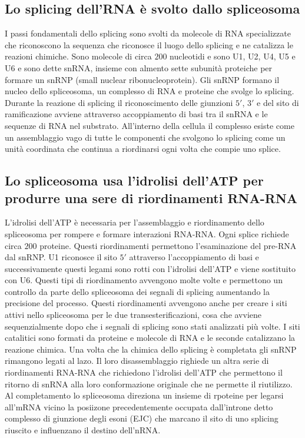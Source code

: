 \subsection{Lo splicing dell'RNA \`e svolto dallo spliceosoma}
I passi fondamentali dello splicing sono svolti da molecole di RNA specializzate che riconoscono la sequenza che riconosce il luogo dello splicing e ne catalizza le reazioni chimiche. 
Sono molecole di circa $200$ nucleotidi e sono U1, U2, U4, U5 e U6 e sono dette snRNA, insieme con almento sette subunit\`a proteiche per formare un snRNP (small nuclear 
ribonucleoprotein). Gli snRNP formano il nucleo dello spliceosoma, un complesso di RNA e proteine che svolge lo splicing. Durante la reazione di splicing il riconoscimento delle
giunzioni $5'$, $3'$ e del sito di ramificazione avviene attraverso accoppiamento di basi tra il snRNA e le sequenze di RNA nel substrato. All'interno della cellula il complesso esiste
come un assemblaggio vago di tutte le componenti che svolgono lo splicing come un unit\`a coordinata che continua a riordinarsi ogni volta che compie uno splice. 
\subsection{Lo spliceosoma usa l'idrolisi dell'ATP per produrre una sere di riordinamenti RNA-RNA}
L'idrolisi dell'ATP \`e necessaria per l'assemblaggio e riordinamento dello spliceosoma per rompere e formare interazioni RNA-RNA. Ogni splice richiede circa $200$ proteine. Questi
riordinamenti permettono l'esaminazione del pre-RNA dal snRNP. U1 riconosce il sito $5'$ attraverso l'accoppiamento di basi e successivamente questi legami sono rotti con l'idrolisi 
dell'ATP e viene sostituito con U6. Questi tipi di riordinamento avvengono molte volte e permettono un controllo da parte dello spliceosoma dei segnali di splicing aumentando la 
precisione del processo. Questi riordinamenti avvengono anche per creare i siti attivi nello spliceosoma per le due transesterificazioni, cosa che avviene sequenzialmente dopo che i 
segnali di splicing sono stati analizzati pi\`u volte. I siti catalitici sono formati da proteine e molecole di RNA e le seconde catalizzano la reazione chimica. Una volta che la 
chimica dello splicing \`e completata gli snRNP rimangono legati al lazo. Il loro disassemblaggio righiede un altra serie di riordinamenti RNA-RNA che richiedono l'idrolisi dell'ATP che
permettono il ritorno di snRNA alla loro conformazione originale che ne permette il riutilizzo. Al completamento lo spliceosoma direziona un insieme di rpoteine per legarsi all'mRNA
vicino la posiizone precedentemente occupata dall'introne detto complesso di giunzione degli esoni (EJC) che marcano il sito di uno splicing riuscito e influenzano il destino dell'nRNA.
